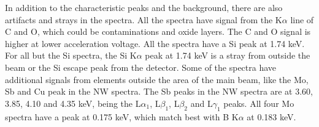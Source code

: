 In addition to the characteristic peaks and the background, there are also artifacts and strays in the spectra. %
All the spectra have signal from the K$\alpha$ line of C and O, which could be contaminations and oxide layers. %
The C and O signal is higher at lower acceleration voltage.
All the spectra have a Si peak at 1.74 keV. %
For all but the Si spectra, the Si K$\alpha$ peak at 1.74 keV is a stray from outside the beam or the Si escape peak from the detector.
Some of the spectra have additional signals from elements outside the area of the main beam, like the Mo, Sb and Cu peak in the NW spectra. %
The Sb peaks in the NW spectra are at 3.60, 3.85, 4.10 and 4.35 keV, being the L$\alpha_1$, L$\beta_1$, L$\beta_2$ and L$\gamma_1$ peaks.
All four Mo spectra have a peak at 0.175 keV, which match best with B K$\alpha$ at 0.183 keV.



